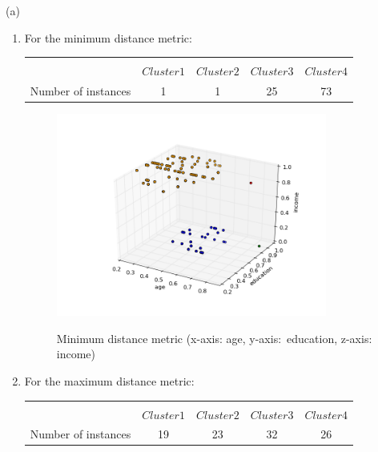 \documentclass[12pt,letterpaper]{article}
\begin{document}
\begin{enumerate}
\begin{enumerate}
        (a)\medskip 
                \begin{enumerate}
                        
                        \item For the minimum distance metric: \medskip \\
                        
                        \begin{tabular}{@{}l | c |  c|  c |  c} \hline \hline  \\ [-2ex]
         & $  Cluster 1  $ & $Cluster 2$ &  $Cluster3$ & $Cluster4$ \\ \hline  \noalign{\smallskip}
      Number of instances   & 1     & 1   & 25  &73  \\ \hline \hline

                        \end{tabular}
                        \begin{figure}[H]
                                \centering
                                \caption{Minimum distance metric (x-axis: age, y-axis:\ education, z-axis: income)} {
                                \includegraphics[width=3.5in]{4ba_min.png} }\\
                        \end{figure}
                        \item  For the maximum distance metric: \medskip
                        
                        \begin{tabular}{@{}l | c |  c|  c |  c} \hline \hline  \\ [-2ex]
         & $  Cluster 1  $ & $Cluster 2$ &  $Cluster3$ & $Cluster4$ \\ \hline  \noalign{\smallskip}
      Number of instances   & 19     & 23   & 32  &26  \\ \hline \hline


\end{tabular}
\end{enumerate}
\end{enumerate}
\end{enumerate}
\end{document}
